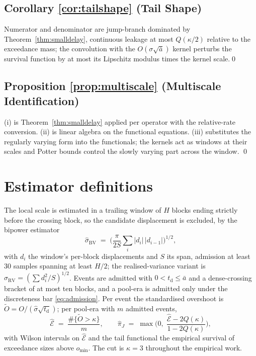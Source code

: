 \documentclass[11pt,a4paper]{article}
\theoremstyle{definition}
\theoremstyle{plain}
\theoremstyle{remark}
\newcommand{\surv}{Q}
\newcommand{\tact}{t_{\mathrm{d}}}
\begin{document}
\subsection{Corollary \ref{cor:tailshape} (Tail Shape)}

Numerator and denominator are jump-branch dominated by Theorem~\ref{thm:smalldelay}, continuous leakage at most $\surv(\kappa/2)$ relative to the exceedance mass; the convolution
with the $O(\sigma\sqrt{\bar a})$ kernel perturbs the survival function by at most its Lipschitz modulus times the kernel scale.\qed

\subsection{Proposition \ref{prop:multiscale} (Multiscale Identification)}

(i) is Theorem~\ref{thm:smalldelay} applied per operator with the relative-rate conversion. (ii) is linear algebra on the functional equations. (iii) substitutes the 
regularly varying form into the functionals; the kernels act as windows at their scales and Potter bounds\cite{bgt1987} control the slowly varying part across the window. \qed


\section{Estimator definitions}\label{app:estimators}

The local scale is estimated in a trailing window of $H$ blocks ending strictly before the crossing block, so the candidate displacement is excluded, by the bipower estimator
\[
\hat\sigma_{\mathrm{BV}} \;=\; \Big(\frac{\pi}{2S}\sum_i |d_i|\,
|d_{i-1}|\Big)^{1/2},
\]
with $d_i$ the window's per-block displacements and $S$ its span, admission at least 30 samples spanning at least $H/2$; the realised-variance variant is $\hat\sigma_{\mathrm{RV}} = (\sum
d_i^2 / S)^{1/2}$. Events are admitted with $0 < \tact \le \bar a$ and a dense-crossing bracket of at most ten blocks, and a pool-era is admitted only under the discreteness bar \eqref{eq:admission}.
Per event the standardised overshoot is $\tilde O = O/(\hat\sigma\sqrt{\tact})$; per pool-era with $m$ admitted events,
\[
\hat{\mathcal{E}} \;=\; \frac{\#\{\tilde O > \kappa\}}{m}, \qquad
\hat\pi_J \;=\; \max\Big(0,\; \frac{\hat{\mathcal{E}} -
2\surv(\kappa)}{1 - 2\surv(\kappa)}\Big),
\]
with Wilson intervals on $\hat{\mathcal{E}}$ and the tail functional the empirical survival of exceedance sizes above $o_{\min}$. The cut is $\kappa = 3$ throughout the empirical work.
\end{document}
